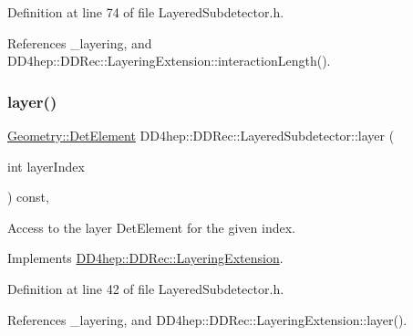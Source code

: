 Definition at line 74 of file Layered\+Subdetector.\+h.



References \+\_\+layering, and D\+D4hep\+::\+D\+D\+Rec\+::\+Layering\+Extension\+::interaction\+Length().

\hypertarget{class_d_d4hep_1_1_d_d_rec_1_1_layered_subdetector_abdb74d9734f117f22fa64d32895f71fc}{}\label{class_d_d4hep_1_1_d_d_rec_1_1_layered_subdetector_abdb74d9734f117f22fa64d32895f71fc} 
\subsubsection{\texorpdfstring{layer()}{layer()}}
{\footnotesize\ttfamily \hyperlink{class_d_d4hep_1_1_geometry_1_1_det_element}{Geometry\+::\+Det\+Element} D\+D4hep\+::\+D\+D\+Rec\+::\+Layered\+Subdetector\+::layer (\begin{DoxyParamCaption}\item[{int}]{layer\+Index }\end{DoxyParamCaption}) const\hspace{0.3cm}{\ttfamily [inline]}, {\ttfamily [virtual]}}



Access to the layer Det\+Element for the given index. 



Implements \hyperlink{class_d_d4hep_1_1_d_d_rec_1_1_layering_extension_a080be80c3277feaa59828b829d29c747}{D\+D4hep\+::\+D\+D\+Rec\+::\+Layering\+Extension}.



Definition at line 42 of file Layered\+Subdetector.\+h.



References \+\_\+layering, and D\+D4hep\+::\+D\+D\+Rec\+::\+Layering\+Extension\+::layer().

\hypertarget{class_d_d4hep_1_1_d_d_rec_1_1_layered_subdetector_add44040c1b0a5578a1fe65d3921a4195}{}\label{class_d_d4hep_1_1_d_d_rec_1_1_layered_subdetector_add44040c1b0a5578a1fe65d3921a4195} 
